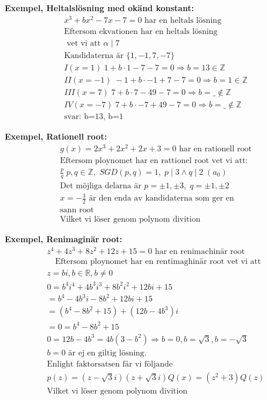 \begin{multicols}{2}
\textbf{Exempel, Heltalslösning med okänd konstant:}
\begin{align*}
  &x^3 + bx^2 - 7x -7 = 0 \text{ har en heltals lösning} \\
  &\text{Eftersom ekvationen har en heltals lösning} \\
  &\text{ vet vi att } \alpha \mid 7\\
  &\text{Kandidaterna är } \{1,-1,7,-7 \} \\
  &I   (x= 1) \;  1 + b\cdot  1 - 7 -7 = 0 \Rightarrow b=13 \in \mathbb{Z} \\
  &II  (x=-1) \; -1 + b\cdot -1 + 7 -7 = 0 \Rightarrow b= 1 \in \mathbb{Z} \\
  &III (x= 7) \;  7 + b\cdot  7 -49 -7 = 0 \Rightarrow b=\_ \notin \mathbb{Z} \\
  &IV  (x=-7) \;  7 + b\cdot -7 +49 -7 = 0 \Rightarrow b=\_ \notin \mathbb{Z} \\
  &\text{svar: b=13, b=1}
\end{align*}

\textbf{Exempel, Rationell root:}
\begin{align*}
  &g(x)= 2x^3 +2x^2 +2x +3 = 0 \text{ har en rationell root} \\
  &\text{Eftersom ploynomet har en rattionel root vet vi att: } \\
  &\frac{p}{q} \; p,q \in \mathbb{Z}, \; SGD(p,q) = 1, \; p \mid 3 \land q \mid 2 \; (a_0) \\
  &\text{Det möjliga delarna är } p=\pm 1,\pm 3, \; q=\pm 1,\pm 2 \\
  &x=-\frac{3}{2} \text{ är den enda av kandidaterna som ger en} \\
  &\text{sann root} \\
  &\text{Vilket vi löser genom polynom divition}
\end{align*}


\textbf{Exempel, Renimaginär root:}
\begin{align*}
  &z^4 + 4z^3 + 8z^2 + 12z +15 = 0 \text{ har en renimachinär root} \\
  &\quad  \text{Eftersom ploynomet har en rentimaghinär root vet vi att } \\
  &z=bi, b \in \mathbb{R}, b \neq 0 \\
  &0= b^4i^4 +4b^3i^3 +8b^2i^2 +12bi +15 \\
  &= b^4 -4b^3i -8b^2 +12bi +15 \\
  &= (b^4-8b^2+15) + (12b-4b^3)i \\
  &=0= b^4-8b^2+15 \\
  &0= 12b-4b^3 = 4b(3-b^2) \Rightarrow b=0, b=\sqrt{3}, b=-\sqrt{3} \\
  &b=0 \text{ är ej en giltig lösning.} \\
  &\text{Enlight faktorsatsen får vi följande} \\
  &p(z)=(z-\sqrt{3}i)(z+\sqrt{3}i)Q(x) = (z^2+3)Q(z) \\
  &\text{Vilket vi löser genom polynom divition}
\end{align*}


\end{multicols}
